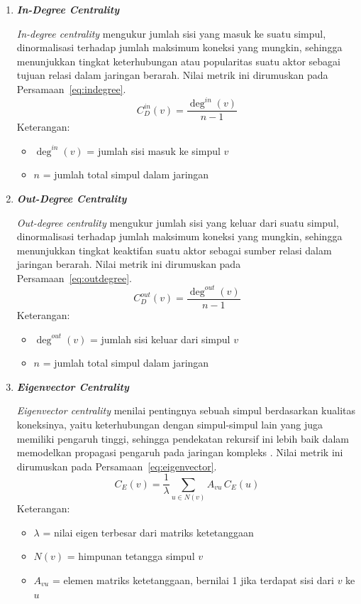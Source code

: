 \begin{enumerate}
	\item \textbf{\textit{In-Degree Centrality}}

	\textit{In-degree centrality} mengukur jumlah sisi yang masuk ke suatu simpul, dinormalisasi terhadap jumlah maksimum koneksi yang mungkin, sehingga menunjukkan tingkat keterhubungan atau popularitas suatu aktor sebagai tujuan relasi dalam jaringan berarah. Nilai metrik ini dirumuskan pada Persamaan~\eqref{eq:indegree}.
	\begin{equation}
	C_{D}^{in}(v) = \frac{\deg^{in}(v)}{n-1}
	\label{eq:indegree}
	\end{equation}
	Keterangan:
	\begin{itemize}[leftmargin=2em,label=$\cdot$]
		\item $\deg^{in}(v)$ = jumlah sisi masuk ke simpul $v$
		\item $n$ = jumlah total simpul dalam jaringan
	\end{itemize}

	\item \textbf{\textit{Out-Degree Centrality}}

	\textit{Out-degree centrality} mengukur jumlah sisi yang keluar dari suatu simpul, dinormalisasi terhadap jumlah maksimum koneksi yang mungkin, sehingga menunjukkan tingkat keaktifan suatu aktor sebagai sumber relasi dalam jaringan berarah. Nilai metrik ini dirumuskan pada Persamaan~\eqref{eq:outdegree}.
	\begin{equation}
	C_{D}^{out}(v) = \frac{\deg^{out}(v)}{n-1}
	\label{eq:outdegree}
	\end{equation}
	Keterangan:
	\begin{itemize}[leftmargin=2em,label=$\cdot$]
		\item $\deg^{out}(v)$ = jumlah sisi keluar dari simpul $v$
		\item $n$ = jumlah total simpul dalam jaringan
	\end{itemize}

	\item \textbf{\textit{Eigenvector Centrality}}

	\textit{Eigenvector centrality} menilai pentingnya sebuah simpul berdasarkan kualitas koneksinya, yaitu keterhubungan dengan simpul-simpul lain yang juga memiliki pengaruh tinggi, sehingga pendekatan rekursif ini lebih baik dalam memodelkan propagasi pengaruh pada jaringan kompleks \cite{Mamatha2024}. Nilai metrik ini dirumuskan pada Persamaan~\eqref{eq:eigenvector}.
	\begin{equation}
	C_E(v) = \frac{1}{\lambda} \sum_{u \in N(v)} A_{vu} \, C_E(u)
	\label{eq:eigenvector}
	\end{equation}
	Keterangan:
	\begin{itemize}[leftmargin=2em,label=$\cdot$]
		\item $\lambda$ = nilai eigen terbesar dari matriks ketetanggaan
		\item $N(v)$ = himpunan tetangga simpul $v$
		\item $A_{vu}$ = elemen matriks ketetanggaan, bernilai 1 jika terdapat sisi dari $v$ ke $u$
	\end{itemize}


\end{enumerate}
